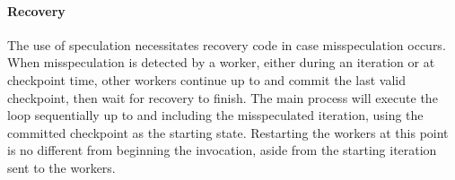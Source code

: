 \paragraph{Recovery}
The use of speculation necessitates recovery code in case
misspeculation occurs.
When misspeculation is detected by a worker, either during an
iteration or at checkpoint time, other workers continue up to and commit the last
valid checkpoint, then wait for recovery to finish.
The main process will execute the loop
sequentially up to and including the misspeculated iteration, using the
committed checkpoint as the starting state. Restarting
the workers at this point is no different from beginning the invocation,
aside from the starting iteration sent to the workers.
